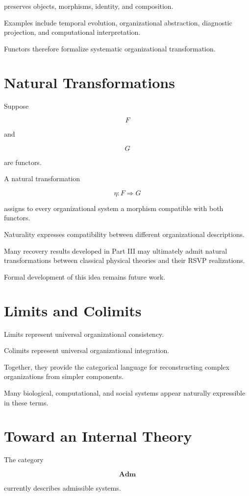 \documentclass[11pt,oneside]{book}
\numberwithin{equation}{chapter}
\theoremstyle{definition}
\theoremstyle{plain}
\begin{document}
preserves objects, morphisms, identity, and composition.

Examples include temporal evolution, organizational abstraction,
diagnostic projection, and computational interpretation.

Functors therefore formalize systematic organizational transformation.

\section{Natural Transformations}

Suppose

\[
F
\]

and

\[
G
\]

are functors.

A natural transformation

\[
\eta
:
F
\Rightarrow
G
\]

assigns to every organizational system a morphism compatible with both
functors.

Naturality expresses compatibility between different organizational
descriptions.

Many recovery results developed in Part III may ultimately admit natural
transformations between classical physical theories and their RSVP
realizations.

Formal development of this idea remains future work.

\section{Limits and Colimits}

Limits represent universal organizational consistency.

Colimits represent universal organizational integration.

Together, they provide the categorical language for reconstructing
complex organizations from simpler components.

Many biological, computational, and social systems appear naturally
expressible in these terms.

\section{Toward an Internal Theory}

The category

\[
\mathbf{Adm}
\]

currently describes admissible systems.
\end{document}
